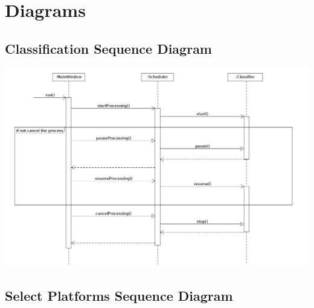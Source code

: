 \documentclass[parskip=full]{scrartcl}
\begin{document}
\pagebreak

\section {Diagrams}

\pagebreak

\subsection {Classification Sequence Diagram}

\begin{center}
\includegraphics[angle=90,origin=c,height=1.0\textwidth]{Classification.jpg}
\end{center}

\pagebreak

\subsection {Select Platforms Sequence Diagram}
\end{document}
